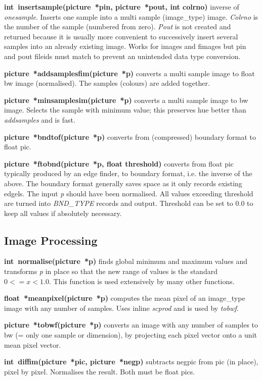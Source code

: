 \documentclass[11pt,twoside,english,a4paper]{article}
\begin{document}
\textbf{int~insertsample(picture~{*pin}, picture~{*pout}, int colrno)} inverse of \emph{onesample}.
Inserts one sample into a multi sample (image\_type) image. 
\emph{Colrno} is the number of the sample (numbered from zero).
\emph{Pout} is not created and returned because it is usually more convenient to 
successively insert several samples into an already existing image. 
Works for images and fimages but pin and pout fileids must match to prevent 
an unintended data type conversion.

\textbf{picture~{*}addsamplesfim(picture~{*p})} converts a multi sample image
to float bw image (normalised). The samples (colours) are added together. 

\textbf{picture~{*}minsamplesim(picture~{*p})} converts a multi sample image
to bw image. Selects the sample with minimum value; this preserves hue better than
\emph{addsamples} and is fast. 

\textbf{picture~{*}bndtof(picture~{*p})} converts from (compressed)
boundary format to float pic.
 
\textbf{picture~{*}ftobnd(picture~{*p},  float threshold)} converts from float pic
typically produced by an edge finder, to boundary format, 
i.e. the inverse of the above. The boundary format generally 
saves space as it only records existing edgels. The input \emph{p}
should have been normalised. All values exceeding threshold are turned into
\emph{BND\_TYPE} records and output. Threshold can be set to 0.0 to keep all
values if absolutely necessary.

\subsection{Image Processing}
\textbf{int~normalise(picture~{*p})} finds global minimum and maximum values
and transforms \emph{p} in place so that the new range of values is the standard
 $0<=x<1.0$. This function is used extensively by many other functions. 
 
\textbf{float~{*}meanpixel(picture~{*p})} computes the mean pixel of an image\_type
image with any number of samples. Uses inline \emph{scprod} and is used by \emph{tobwf}.

\textbf{picture~{*}tobwf(picture~{*p})} converts an image with any number of samples
to bw (= only one sample or dimension),
by projecting each pixel vector onto a unit mean pixel vector.

\textbf{int~diffim(picture~{*pic}, picture~{*negp})} subtracts negpic
from pic (in place), pixel by pixel. Normalises the result. Both must be float pics. 
\end{document}

